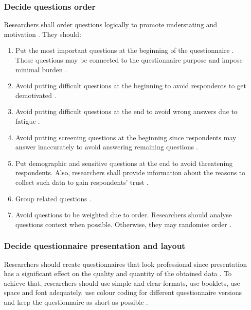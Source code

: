 \subsubsection{Decide questions order}
Researchers shall order questions logically to promote understating and motivation \cite{Diem,Krosnick2009}. They should:
\begin{enumerate}
    \item Put the most important questions at the beginning of the questionnaire \cite{Diem}. Those questions may be connected to the questionnaire purpose and impose minimal burden \cite{Krosnick2009}.
    
    \item Avoid putting difficult questions at the beginning to avoid respondents to get demotivated \cite{Krosnick2009}.
    
    \item Avoid putting difficult questions at the end to avoid wrong answers due to fatigue \cite{Krosnick2009}.
    
    \item Avoid putting screening questions at the beginning since respondents may answer inaccurately to avoid answering remaining questions \cite{Krosnick2009}.
    
    \item Put demographic and sensitive questions at the end to avoid threatening respondents. Also, researchers shall provide information about the reasons to collect such data to gain respondents' trust \cite{Boynton2004b,Krosnick2009}.
    
    \item Group related questions \cite{Krosnick2009}.
    
    \item Avoid questions to be weighted due to order. Researchers should analyse questions context when possible. Otherwise, they may randomise order \cite{Krosnick2009}.
\end{enumerate}

\subsubsection{Decide questionnaire presentation and layout}
Researchers should create questionnaires that look professional since presentation has a significant effect on the quality and quantity of the obtained data \cite{Diem,Crawford1997}. To achieve that, researchers should use simple and clear formats, use booklets, use space and font adequately, use colour coding for different questionnaire versions and keep the questionnaire as short as possible \cite{Crawford1997}.

